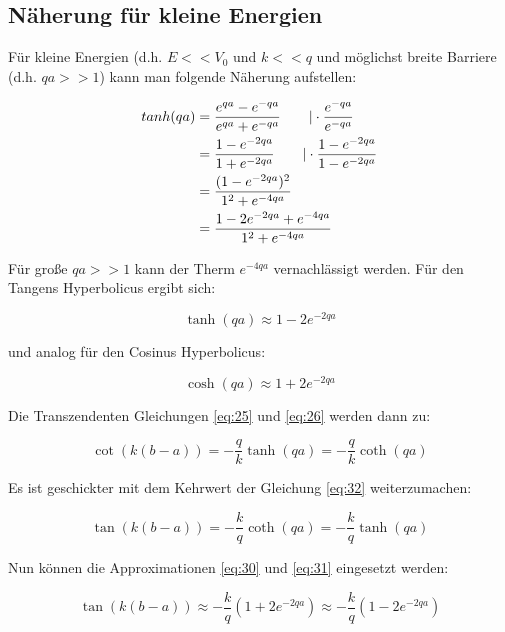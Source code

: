 \subsection{Näherung für kleine Energien}

Für kleine Energien (d.h. \(E<<V_0\) und \(k<<q\) und möglichst breite Barriere (d.h. \(qa>>1\)) kann man folgende Näherung aufstellen:

\begin{align}
  \label{eq:29}
  tanh(qa) &= \frac{e^{qa}-e^{-qa}}{e^{qa}+e^{-qa}} \qquad |\cdot  \frac{e^{-qa}}{e^{-qa}}  \notag\\
&= \frac{1-e^{-2qa}}{1+e^{-2qa}} \qquad |\cdot \frac{1-e^{-2qa}}{1-e^{-2qa}}  \notag\\
&= \frac{(1-e^{-2qa})^2}{1^2+e^{-4qa}} \notag \\
&= \frac{1-2e^{-2qa}+e^{-4qa}}{1^2+e^{-4qa}}
\end{align}

Für große  \(qa>>1\) kann der Therm \( e^{-4qa} \) vernachlässigt werden. Für den Tangens Hyperbolicus ergibt sich:

\begin{equation}
  \label{eq:30}
   \tanh(qa) \approx 1-2e^{-2qa}
\end{equation}

und analog für den Cosinus Hyperbolicus:

\begin{equation}
  \label{eq:31}
   \cosh(qa) \approx 1+2e^{-2qa}
\end{equation}


Die Transzendenten Gleichungen \eqref{eq:25} und \eqref{eq:26} werden dann zu:


\begin{equation}
  \label{eq:32}
  \cot(k(b-a)) = - \frac{q}{k} \tanh(qa) =  - \frac{q}{k}\coth(qa)
\end{equation}

Es ist geschickter mit dem Kehrwert der Gleichung \eqref{eq:32} weiterzumachen:


\begin{equation}
  \label{eq:33}
  \tan(k(b-a)) = - \frac{k}{q} \coth(qa) =  - \frac{k}{q}\tanh(qa)
\end{equation}

Nun können die Approximationen \eqref{eq:30} und \eqref{eq:31} eingesetzt werden:

\begin{equation}
  \label{eq:34}
  \tan(k(b-a)) \approx - \frac{k}{q} (1+2e^{-2qa}) \approx  - \frac{k}{q}(1-2e^{-2qa})
\end{equation}

